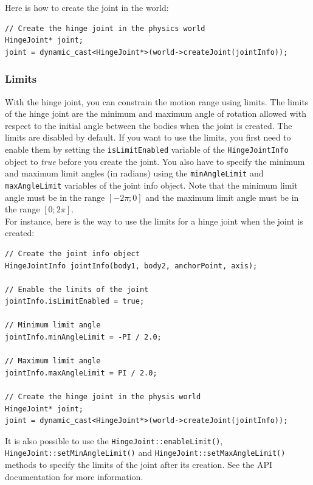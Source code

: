 \documentclass[a4paper,12pt]{article}
\begin{document}
    Here is how to create the joint in the world: \\

    \begin{lstlisting}
// Create the hinge joint in the physics world
HingeJoint* joint;
joint = dynamic_cast<HingeJoint*>(world->createJoint(jointInfo));
  \end{lstlisting}

     \subsubsection{Limits}

     With the hinge joint, you can constrain the motion range using limits. The limits of the hinge joint are the minimum and maximum angle of rotation allowed with respect to the initial
     angle between the bodies when the joint is created. The limits are disabled by default. If you want to use the limits, you first need to enable them by setting the
     \texttt{isLimitEnabled} variable of the \texttt{HingeJointInfo} object to \emph{true} before you create the joint. You also have to specify the minimum and maximum limit
     angles (in radians) using the \texttt{minAngleLimit} and \texttt{maxAngleLimit} variables of the joint info object. Note that the minimum limit angle must be in the
     range $[ -2 \pi; 0 ]$ and the maximum limit angle must be in the range $[ 0; 2 \pi ]$. \\

     For instance, here is the way to use the limits for a hinge joint when the joint is created: \\

     \begin{lstlisting}
// Create the joint info object
HingeJointInfo jointInfo(body1, body2, anchorPoint, axis);

// Enable the limits of the joint
jointInfo.isLimitEnabled = true;

// Minimum limit angle
jointInfo.minAngleLimit = -PI / 2.0;

// Maximum limit angle
jointInfo.maxAngleLimit = PI / 2.0;

// Create the hinge joint in the physis world
HingeJoint* joint;
joint = dynamic_cast<HingeJoint*>(world->createJoint(jointInfo));
  \end{lstlisting}

     \vspace{0.6cm}

     \begin{sloppypar}
        It is also possible to use the \texttt{HingeJoint::enableLimit()}, \texttt{HingeJoint::setMinAngleLimit()} and \texttt{HingeJoint::setMaxAngleLimit()} methods to specify
        the limits of the joint after its creation. See the API documentation for more information.
     \end{sloppypar}
\end{document}
